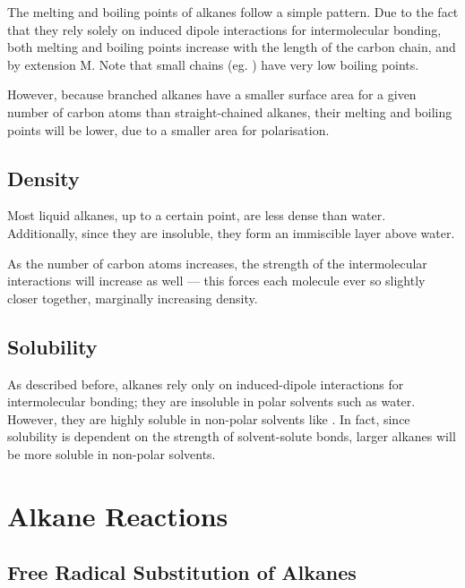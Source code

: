 			The melting and boiling points of alkanes follow a simple pattern. Due to the fact that they rely solely on induced
			dipole interactions for intermolecular bonding, both melting and boiling points increase with the length of the
			carbon chain, and by extension M. Note that small chains (eg. ) have very low boiling points.

			However, because branched alkanes have a smaller surface area for a given number of carbon atoms than straight-chained
			alkanes, their melting and boiling points will be lower, due to a smaller area for polarisation.


		\subsection{Density}

			Most liquid alkanes, up to a certain point, are less dense than water. Additionally, since they are insoluble,
			they form an immiscible layer above water.

			As the number of carbon atoms increases, the strength of the intermolecular interactions will increase as well –– this
			forces each molecule ever so slightly closer together, marginally increasing density.


		\subsection{Solubility}

			As described before, alkanes rely only on induced-dipole interactions for intermolecular bonding; they are insoluble in
			polar solvents such as water. However, they are highly soluble in non-polar solvents like . In fact,
			since solubility is dependent on the strength of solvent-solute bonds, larger alkanes will be more soluble in non-polar solvents.



	\pagebreak
	\section{Alkane Reactions}
		\subsection{Free Radical Substitution of Alkanes}

